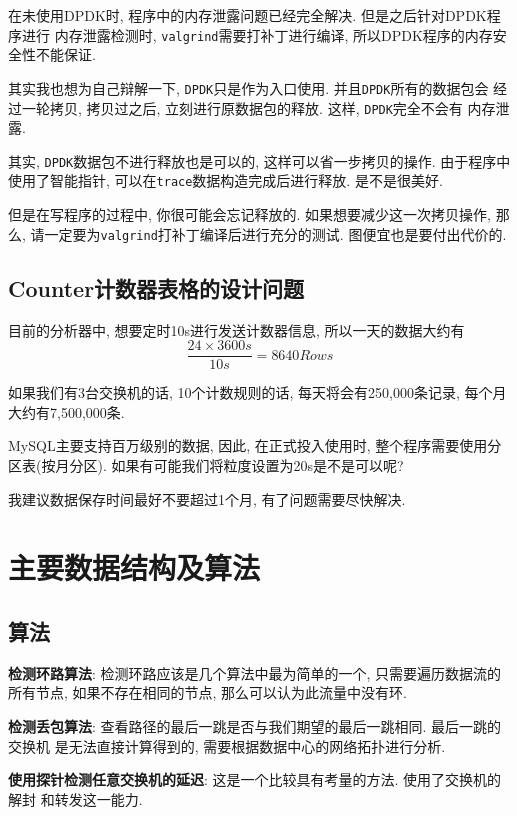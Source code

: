 在未使用DPDK时, 程序中的内存泄露问题已经完全解决.
但是之后针对DPDK程序进行 内存泄露检测时,
\texttt{valgrind}需要打补丁进行编译, 所以DPDK程序的内存安全性不能保证.

其实我也想为自己辩解一下, \texttt{DPDK}只是作为入口使用.
并且\texttt{DPDK}所有的数据包会 经过一轮拷贝, 拷贝过之后,
立刻进行原数据包的释放. 这样, \texttt{DPDK}完全不会有 内存泄露.

其实, \texttt{DPDK}数据包不进行释放也是可以的, 这样可以省一步拷贝的操作.
由于程序中 使用了智能指针, 可以在\texttt{trace}数据构造完成后进行释放.
是不是很美好.

但是在写程序的过程中, 你很可能会忘记释放的. 如果想要减少这一次拷贝操作, 那么,
请一定要为\texttt{valgrind}打补丁编译后进行充分的测试.
图便宜也是要付出代价的.

\section{Counter计数器表格的设计问题}

目前的分析器中, 想要定时10s进行发送计数器信息, 所以一天的数据大约有
$$\frac{24 \times 3600 s}{10s} = 8640 Rows $$

如果我们有3台交换机的话, 10个计数规则的话, 每天将会有250,000条记录,
每个月大约有7,500,000条.

MySQL主要支持百万级别的数据, 因此, 在正式投入使用时,
整个程序需要使用分区表(按月分区).
如果有可能我们将粒度设置为20s是不是可以呢?

我建议数据保存时间最好不要超过1个月, 有了问题需要尽快解决.

\chapter{主要数据结构及算法}\label{chap:主要数据结构及算法}

\section{算法}

\textbf{检测环路算法}: 检测环路应该是几个算法中最为简单的一个,
只需要遍历数据流的所有节点, 如果不存在相同的节点,
那么可以认为此流量中没有环.

\textbf{检测丢包算法}: 查看路径的最后一跳是否与我们期望的最后一跳相同.
最后一跳的交换机 是无法直接计算得到的,
需要根据数据中心的网络拓扑进行分析.

\textbf{使用探针检测任意交换机的延迟}: 这是一个比较具有考量的方法.
使用了交换机的解封 和转发这一能力.

